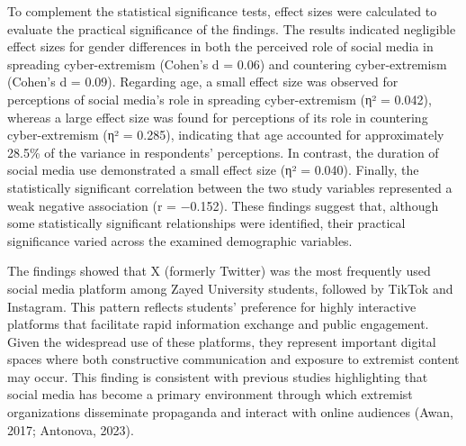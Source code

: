 \documentclass[10pt]{NSP1}
\begin{document}
To complement the statistical significance tests, effect sizes were calculated to evaluate the practical significance of the findings. The results indicated negligible effect sizes for gender differences in both the perceived role of social media in spreading cyber-extremism (Cohen's d = 0.06) and countering cyber-extremism (Cohen's d = 0.09). Regarding age, a small effect size was observed for perceptions of social media's role in spreading cyber-extremism (η² = 0.042), whereas a large effect size was found for perceptions of its role in countering cyber-extremism (η² = 0.285), indicating that age accounted for approximately 28.5\% of the variance in respondents' perceptions. In contrast, the duration of social media use demonstrated a small effect size (η² = 0.040). Finally, the statistically significant correlation between the two study variables represented a weak negative association (r = −0.152). These findings suggest that, although some statistically significant relationships were identified, their practical significance varied across the examined demographic variables.

\par\medskip{}\smallskip

The findings showed that X (formerly Twitter) was the most frequently used social media platform among Zayed University students, followed by TikTok and Instagram. This pattern reflects students' preference for highly interactive platforms that facilitate rapid information exchange and public engagement. Given the widespread use of these platforms, they represent important digital spaces where both constructive communication and exposure to extremist content may occur. This finding is consistent with previous studies highlighting that social media has become a primary environment through which extremist organizations disseminate propaganda and interact with online audiences (Awan, 2017; Antonova, 2023).
\end{document}
